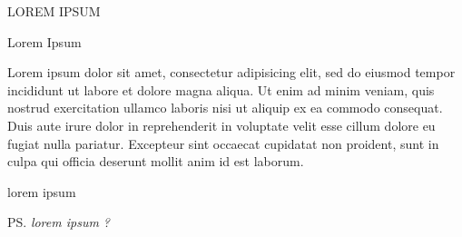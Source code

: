 \documentclass{letter}
\begin{document}
  \begin{letter}{LOREM IPSUM}
    \opening{Lorem Ipsum}
    Lorem ipsum dolor sit amet, consectetur adipisicing elit, sed do eiusmod tempor incididunt ut labore et dolore magna aliqua. Ut enim ad minim veniam, quis nostrud exercitation ullamco laboris nisi ut aliquip ex ea commodo consequat. Duis aute irure dolor in reprehenderit in voluptate velit esse cillum dolore eu fugiat nulla pariatur. Excepteur sint occaecat cupidatat non proident, sunt in culpa qui officia deserunt mollit anim id est laborum.
    \closing{lorem ipsum}
    \ps
    \textit{lorem ipsum ?}
  \end{letter}
\end{document}
